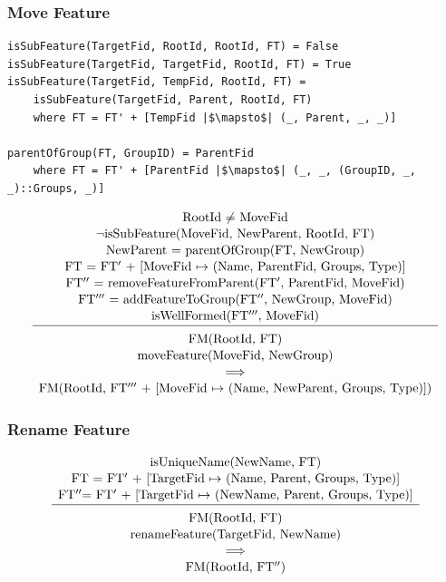\documentclass[a4paper,english]{ifimaster}
\begin{document}
\subsubsection*{Move Feature}
\begin{verbatim}
isSubFeature(TargetFid, RootId, RootId, FT) = False
isSubFeature(TargetFid, TargetFid, RootId, FT) = True
isSubFeature(TargetFid, TempFid, RootId, FT) = 
    isSubFeature(TargetFid, Parent, RootId, FT)
    where FT = FT' + [TempFid |$\mapsto$| (_, Parent, _, _)]
    
parentOfGroup(FT, GroupID) = ParentFid
    where FT = FT' + [ParentFid |$\mapsto$| (_, _, (GroupID, _, _)::Groups, _)]
\end{verbatim}
\begin{equation*}
\begin{array}{c} 
\text{RootId $\neq$ MoveFid} \\[1pt]
\text{$\neg$isSubFeature(MoveFid, NewParent, RootId, FT)} \\[1pt] 
\text{NewParent = parentOfGroup(FT, NewGroup)} \\[1pt]
\text{FT = FT$'$ + [MoveFid $\mapsto$ (Name, ParentFid, Groups, Type)]} \\[1pt]
\text{FT$''$ = removeFeatureFromParent(FT$'$, ParentFid, MoveFid)} \\[1pt]
\text{FT$'''$ = addFeatureToGroup(FT$''$, NewGroup, MoveFid)} \\[1pt]
\text{isWellFormed(FT$'''$, MoveFid)} \\[1pt]
\hline\\[-7pt]
\text{FM(RootId, FT)} \\[1pt]
\text{moveFeature(MoveFid, NewGroup)}  \\[1pt]
\implies \\[1pt]
\text{FM(RootId, FT$'''$ + [MoveFid $\mapsto$ (Name, NewParent, Groups, Type)])}
\end{array} 
\end{equation*}

\subsubsection*{Rename Feature}
\begin{equation*}
\begin{array}{c}
\text{isUniqueName(NewName, FT)} \\[1pt]
\text{FT = FT$'$ + [TargetFid $\mapsto$ (Name, Parent, Groups, Type)]} \\[1pt]
\text{FT$''$= FT$'$ + [TargetFid $\mapsto$ (NewName, Parent, Groups, Type)]} \\[1pt]
\hline\\[-7pt]
\text{FM(RootId, FT)} \\[1pt]
\text{renameFeature(TargetFid, NewName)}  \\[1pt]
\implies \\[1pt]
\text{FM(RootId, FT$''$)}
\end{array} 
\end{equation*}
\end{document}
